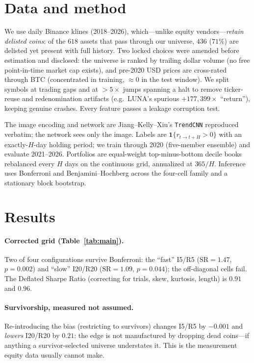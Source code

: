 \documentclass[10pt,twocolumn]{article}
\newcommand{\sharpe}{\ensuremath{\mathrm{SR}}}
\begin{document}
\section{Data and method}
We use daily Binance klines (2018--2026), which---unlike equity vendors---\emph{retain delisted
coins}: of the $618$ assets that pass through our universe, $436$ ($71\%$) are delisted yet present with
full history. Two locked choices were amended before estimation and disclosed: the universe is ranked
by trailing dollar volume (no free point-in-time market cap exists), and pre-2020 USD prices are
cross-rated through BTC (concentrated in training, $\approx\!0$ in the test window). We split symbols at
trading gaps and at $>\!5\times$ jumps spanning a halt to remove ticker-reuse and redenomination
artifacts (e.g.\ LUNA's spurious $+177{,}399\times$ ``return''), keeping genuine crashes. Every feature
passes a leakage corruption test.

The image encoding and network are Jiang--Kelly--Xiu's \texttt{TrendCNN} reproduced verbatim; the
network sees only the image. Labels are $\mathbf{1}\{r_{t\to t+H}>0\}$ with an exactly-$H$-day holding
period; we train through 2020 (five-member ensemble) and evaluate 2021--2026. Portfolios are
equal-weight top-minus-bottom decile books rebalanced every $H$ days on the continuous grid, annualized
at $365/H$. Inference uses Bonferroni and Benjamini--Hochberg across the four-cell family and a
stationary block bootstrap.

\section{Results}
\paragraph{Corrected grid (Table~\ref{tab:main}).} Two of four configurations survive Bonferroni:
the ``fast'' I5/R5 ($\sharpe=1.47$, $p=0.002$) and ``slow'' I20/R20 ($\sharpe=1.09$, $p=0.044$); the
off-diagonal cells fail. The Deflated Sharpe Ratio \cite{dsr} (correcting for trials, skew, kurtosis,
length) is $0.91$ and $0.96$.

\paragraph{Survivorship, measured not assumed.} Re-introducing the bias (restricting to survivors)
changes I5/R5 by $-0.001$ and \emph{lowers} I20/R20 by $0.21$: the edge is not manufactured by dropping
dead coins---if anything a survivor-selected universe understates it. This is the measurement equity
data usually cannot make.
\end{document}
